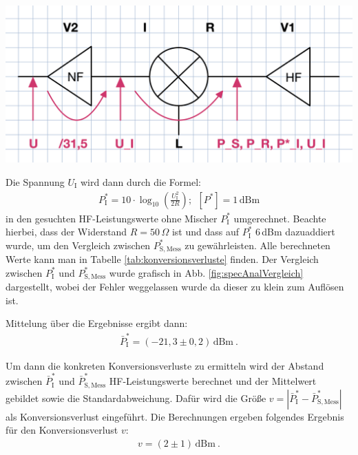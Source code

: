 \begin{center}
    \captionsetup{type=figure}
    \includegraphics[scale=0.18]{Bilder/Schaltschema.png}
    \label{fig:schaltschema}
\end{center}

Die Spannung $U_\mathrm{I}$ wird dann durch die Formel:
\begin{gather}
    P^*_\mathrm{I} = 10\cdot\log_{10}\left(\frac{U_\mathrm{I}^2}{2R}\right);~~[P^*] = 1\,\mathrm{dBm}
\end{gather}
in den gesuchten HF-Leistungswerte ohne Mischer $P_\mathrm{I}^*$ umgerechnet. \cite{anleitung} Beachte hierbei, dass der Widerstand $R=50\,\Omega$ ist und dass auf $P_\mathrm{I}^*$ 6\,dBm dazuaddiert wurde, um den Vergleich zwischen $P_\mathrm{S,Mess}^*$ zu gewährleisten. \cite{anleitung} Alle berechneten Werte kann man in Tabelle \ref{tab:konversionsverluste} finden. Der Vergleich zwischen $P^*_\mathrm{I}$ und $P^*_\mathrm{S,Mess}$ wurde grafisch in Abb. \ref{fig:specAnalVergleich} dargestellt, wobei der Fehler weggelassen wurde da dieser zu klein zum Auflösen ist. 

Mittelung über die Ergebnisse ergibt dann:
\begin{gather}
    \boxed{\bar{P}_\mathrm{I}^* = (- 21,3 \pm 0,2)\,\mathrm{dBm}}~.
\end{gather}

Um dann die konkreten Konversionsverluste zu ermitteln wird der Abstand zwischen $\bar{P}^*_\mathrm{I}$ und $\bar{P}^*_\mathrm{S,Mess}$ HF-Leistungswerte berechnet und der Mittelwert gebildet sowie die Standardabweichung. Dafür wird die Größe $v = |\bar{P}^*_\mathrm{I} - \bar{P}^*_\mathrm{S,Mess}|$ als Konversionsverlust eingeführt. Die Berechnungen ergeben folgendes Ergebnis für den Konversionsverlust $v$:
\begin{gather}
    \boxed{v = (2 \pm 1)\,\mathrm{dBm}}~.
\end{gather}

